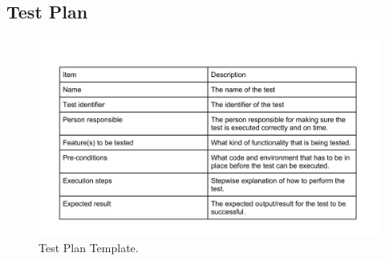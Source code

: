 \subsection{Test Plan}
\begin{figure}[hthp]
\begin{center}
\includegraphics[width = \textwidth/3*2]{Appendix/testplanTemp.jpg}
\caption{Test Plan Template.}
\label{TestPlanTemplate}
\end{center}
\end{figure}
\newpage

